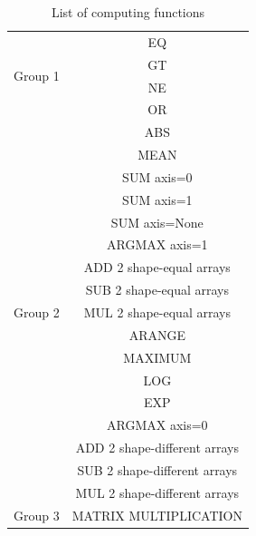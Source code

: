 \begin{table}[]
\centering
\caption{List of computing functions}
\label{list-func}
\begin{tabular}{|c|c|}
\hline
\multirow{4}{*}{Group 1} 					& EQ \\ \cline{2-2} 
\multirow{4}{*}{}                         	& GT \\ \cline{2-2} 
\multirow{4}{*}{}                         	& NE \\ \cline{2-2} 
\multirow{4}{*}{}                         	& OR \\ \hline

\multirow{17}{*}{Group 2} 	 				& ABS \\ \cline{2-2}
\multirow{17}{*}{} 							& MEAN \\ \cline{2-2}
\multirow{17}{*}{} 							& SUM axis=0 \\ \cline{2-2}
\multirow{17}{*}{} 							& SUM axis=1 \\ \cline{2-2}
\multirow{17}{*}{} 			 				& SUM axis=None \\ \cline{2-2}
\multirow{17}{*}{} 			 				& ARGMAX axis=1 \\ \cline{2-2}
\multirow{17}{*}{} 							& ADD 2 shape-equal arrays  \\ \cline{2-2}
\multirow{17}{*}{} 							& SUB 2 shape-equal arrays\\ \cline{2-2}
\multirow{17}{*}{} 							& MUL 2 shape-equal arrays \\ \cline{2-2}
\multirow{17}{*}{} 				 			& ARANGE \\ \cline{2-2}
\multirow{17}{*}{} 							& MAXIMUM \\ \cline{2-2}
\multirow{17}{*}{} 							& LOG \\ \cline{2-2}
\multirow{17}{*}{}		 					& EXP \\ \cline{2-2}
\multirow{17}{*}{} 							& ARGMAX axis=0 \\ \cline{2-2}
\multirow{17}{*}{}  							& ADD 2 shape-different arrays \\ \cline{2-2}
\multirow{17}{*}{} 		 					& SUB 2 shape-different arrays\\ \cline{2-2}
\multirow{17}{*}{} 		 					& MUL 2 shape-different arrays\\ \hline

Group 3 										& MATRIX MULTIPLICATION \\ \hline
\end{tabular}
\end{table}


